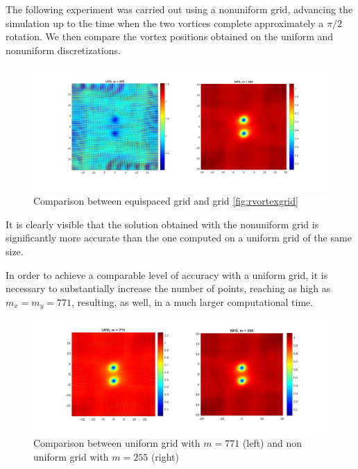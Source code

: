 The following experiment was carried out using a nonuniform grid, advancing the simulation up to the time when the two vortices complete approximately a $\pi/2$ rotation. We then compare the vortex positions obtained on the uniform and nonuniform discretizations.

\begin{figure}[H]
    \centering
    \includegraphics[width=\textwidth]{img/comp_unfd.pdf}
    \caption{Comparison between equispaced grid and grid \ref{fig:rvortexgrid}}
\end{figure}

It is clearly visible that the solution obtained with the nonuniform grid is significantly more accurate than the one computed on a uniform grid of the same size.

In order to achieve a comparable level of accuracy with a uniform grid, it is necessary to substantially increase the number of points, reaching as high as $m_x = m_y = 771$, resulting, as well, in a much larger computational time.

\begin{figure}[H]
    \centering
    \includegraphics[width=\textwidth]{img/comp_unfd_771.pdf}
    \caption{Comparison between uniform grid with $m = 771$ (left) and non uniform grid with $m = 255$ (right)}
\end{figure}

